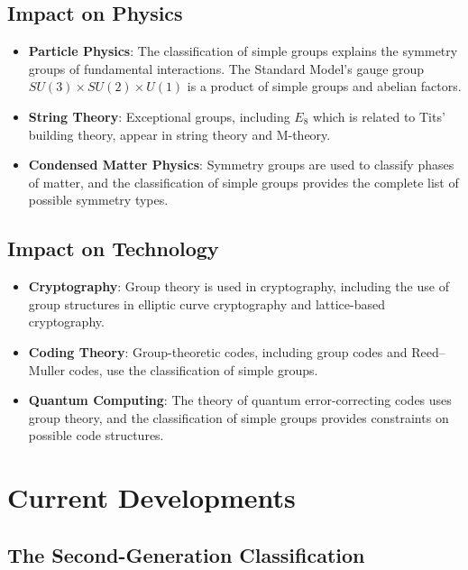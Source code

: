\subsection{Impact on Physics}

\begin{itemize}
\item \textbf{Particle Physics}: The classification of simple groups explains the symmetry groups of fundamental interactions. The Standard Model's gauge group $SU(3) \times SU(2) \times U(1)$ is a product of simple groups and abelian factors.

\item \textbf{String Theory}: Exceptional groups, including $E_8$ which is related to Tits' building theory, appear in string theory and M-theory.

\item \textbf{Condensed Matter Physics}: Symmetry groups are used to classify phases of matter, and the classification of simple groups provides the complete list of possible symmetry types.
\end{itemize}

\subsection{Impact on Technology}

\begin{itemize}
\item \textbf{Cryptography}: Group theory is used in cryptography, including the use of group structures in elliptic curve cryptography and lattice-based cryptography.

\item \textbf{Coding Theory}: Group-theoretic codes, including group codes and Reed--Muller codes, use the classification of simple groups.

\item \textbf{Quantum Computing}: The theory of quantum error-correcting codes uses group theory, and the classification of simple groups provides constraints on possible code structures.
\end{itemize}

\section{Current Developments}

\subsection{The Second-Generation Classification}

